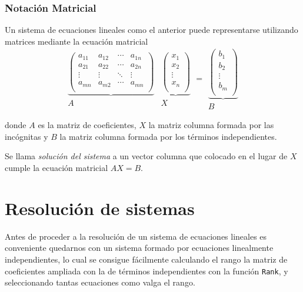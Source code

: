 \documentclass[a4paper]{article}
\begin{document}
\subsubsection*{Notación Matricial}
Un sistema de ecuaciones lineales como el anterior puede representarse utilizando matrices mediante la ecuación matricial
\[\begin{array}{c}
\underbrace{\left(
\begin{array}{cccc}
 a_{11} & a_{12} & \cdots & a_{1n} \\
 a_{21} & a_{22} & \cdots & a_{2n} \\
 \vdots & \vdots & \ddots & \vdots \\
 a_{mn} & a_{m2} & \cdots & a_{mn} \\
\end{array}
\right)}\\
A
\end{array}
\begin{array}{c}
\underbrace{\left(
\begin{array}{c}
  x_1   \\
  x_2   \\
 \vdots \\
  x_ n  \\
\end{array}
\right)}\\
X
\end{array}
=
\begin{array}{c}
\underbrace{\left(
\begin{array}{c}
  b_1   \\
  b_2   \\
 \vdots \\
  b_m   \\
\end{array}
\right)}\\
B
\end{array}
\]

donde $A$ es la matriz de coeficientes, $X$ la matriz columna formada por las incógnitas y $B$ la matriz columna formada por los términos independientes.

Se llama \emph{solución del sistema} a un vector columna que colocado en el lugar de $X$ cumple la ecuación matricial $AX=B$.

\section*{Resolución de sistemas}

Antes de proceder a la resolución de un sistema de ecuaciones lineales es conveniente quedarnos con un sistema formado por ecuaciones linealmente independientes, lo cual se consigue fácilmente calculando el rango la matriz de coeficientes ampliada con la de términos independientes con la función \texttt{Rank}, y seleccionando tantas ecuaciones como valga el rango. 
\end{document}
